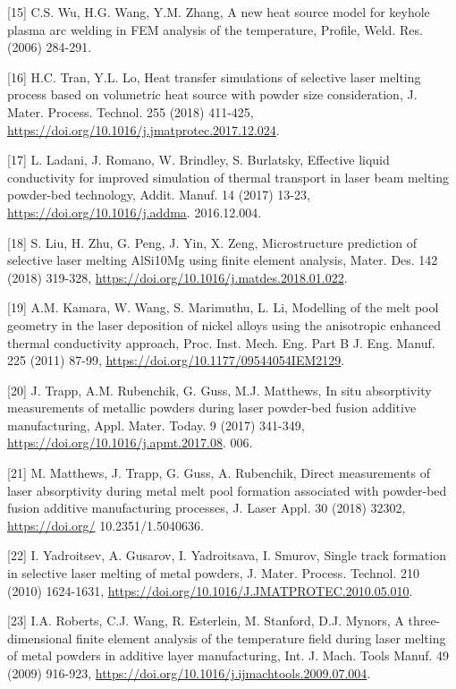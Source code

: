 \documentclass[10pt]{article}
\begin{document}
[15] C.S. Wu, H.G. Wang, Y.M. Zhang, A new heat source model for keyhole plasma arc welding in FEM analysis of the temperature, Profile, Weld. Res. (2006) 284-291.

[16] H.C. Tran, Y.L. Lo, Heat transfer simulations of selective laser melting process based on volumetric heat source with powder size consideration, J. Mater. Process. Technol. 255 (2018) 411-425, \href{https://doi.org/10.1016/j.jmatprotec.2017.12.024}{https://doi.org/10.1016/j.jmatprotec.2017.12.024}.

[17] L. Ladani, J. Romano, W. Brindley, S. Burlatsky, Effective liquid conductivity for improved simulation of thermal transport in laser beam melting powder-bed technology, Addit. Manuf. 14 (2017) 13-23, \href{https://doi.org/10.1016/j.addma}{https://doi.org/10.1016/j.addma}. 2016.12.004.

[18] S. Liu, H. Zhu, G. Peng, J. Yin, X. Zeng, Microstructure prediction of selective laser melting AlSi10Mg using finite element analysis, Mater. Des. 142 (2018) 319-328, \href{https://doi.org/10.1016/j.matdes.2018.01.022}{https://doi.org/10.1016/j.matdes.2018.01.022}.

[19] A.M. Kamara, W. Wang, S. Marimuthu, L. Li, Modelling of the melt pool geometry in the laser deposition of nickel alloys using the anisotropic enhanced thermal conductivity approach, Proc. Inst. Mech. Eng. Part B J. Eng. Manuf. 225 (2011) 87-99, \href{https://doi.org/10.1177/09544054IEM2129}{https://doi.org/10.1177/09544054IEM2129}.

[20] J. Trapp, A.M. Rubenchik, G. Guss, M.J. Matthews, In situ absorptivity measurements of metallic powders during laser powder-bed fusion additive manufacturing, Appl. Mater. Today. 9 (2017) 341-349, \href{https://doi.org/10.1016/j.apmt.2017.08}{https://doi.org/10.1016/j.apmt.2017.08}. 006.

[21] M. Matthews, J. Trapp, G. Guss, A. Rubenchik, Direct measurements of laser absorptivity during metal melt pool formation associated with powder-bed fusion additive manufacturing processes, J. Laser Appl. 30 (2018) 32302, \href{https://doi.org/}{https://doi.org/} 10.2351/1.5040636.

[22] I. Yadroitsev, A. Gusarov, I. Yadroitsava, I. Smurov, Single track formation in selective laser melting of metal powders, J. Mater. Process. Technol. 210 (2010) 1624-1631, \href{https://doi.org/10.1016/J.JMATPROTEC.2010.05.010}{https://doi.org/10.1016/J.JMATPROTEC.2010.05.010}.

[23] I.A. Roberts, C.J. Wang, R. Esterlein, M. Stanford, D.J. Mynors, A three-dimensional finite element analysis of the temperature field during laser melting of metal powders in additive layer manufacturing, Int. J. Mach. Tools Manuf. 49 (2009) 916-923, \href{https://doi.org/10.1016/j.ijmachtools.2009.07.004}{https://doi.org/10.1016/j.ijmachtools.2009.07.004}.
\end{document}
